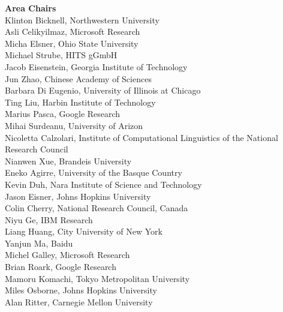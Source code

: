 {\bf Area Chairs} \\
Klinton Bicknell, Northwestern University  \\
Asli Celikyilmaz, Microsoft Research  \\
Micha Elsner, Ohio State University  \\
Michael Strube, HITS gGmbH  \\
Jacob Eisenstein, Georgia Institute of Technology  \\
Jun Zhao, Chinese Academy of Sciences  \\
Barbara Di Eugenio, University of Illinois at Chicago  \\
Ting Liu, Harbin Institute of Technology  \\
Marius Pasca, Google Research  \\
Mihai Surdeanu, University of Arizon \\
Nicoletta Calzolari, Institute of Computational Linguistics of the National Research Council  \\
Nianwen Xue, Brandeis University  \\
Eneko Agirre, University of the Basque Country  \\
Kevin Duh, Nara Institute of Science and Technology  \\
Jason Eisner, Johns Hopkins University  \\
Colin Cherry, National Research Council, Canada  \\
Niyu Ge, IBM Research  \\
Liang Huang, City University of New York  \\
Yanjun Ma, Baidu  \\
Michel Galley, Microsoft Research  \\
Brian Roark, Google Research  \\
Mamoru Komachi, Tokyo Metropolitan University  \\
Miles Osborne, Johns Hopkins University  \\
Alan Ritter, Carnegie Mellon University  \\
